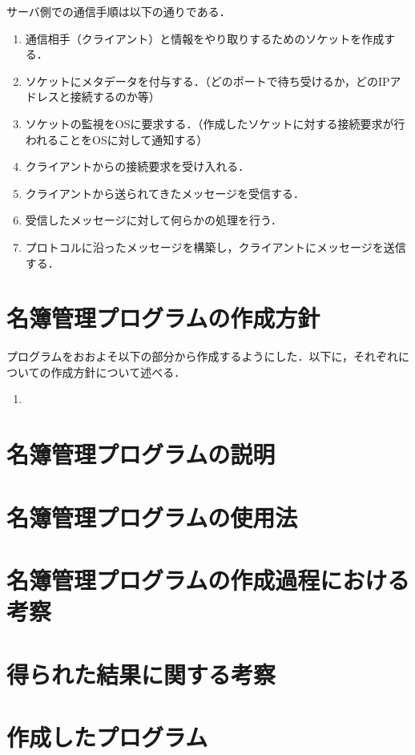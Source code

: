 \documentclass[11pt]{jsarticle}
\begin{document}
サーバ側での通信手順は以下の通りである．

\begin{enumerate}
      \item 通信相手（クライアント）と情報をやり取りするためのソケットを作成する．
      \item ソケットにメタデータを付与する．（どのポートで待ち受けるか，どのIPアドレスと接続するのか等）
      \item ソケットの監視をOSに要求する．（作成したソケットに対する接続要求が行われることをOSに対して通知する）
      \item クライアントからの接続要求を受け入れる．
      \item クライアントから送られてきたメッセージを受信する．
      \item 受信したメッセージに対して何らかの処理を行う．
      \item プロトコルに沿ったメッセージを構築し，クライアントにメッセージを送信する．
\end{enumerate}

\section{名簿管理プログラムの作成方針}

プログラムをおおよそ以下の部分から作成するようにした．以下に，それぞれについての作成方針について述べる．

\begin{enumerate}
      \item 
\end{enumerate}



\section{名簿管理プログラムの説明}



\section{名簿管理プログラムの使用法}


\section{名簿管理プログラムの作成過程における考察}
\section{得られた結果に関する考察}
\section{作成したプログラム}
\end{document}
